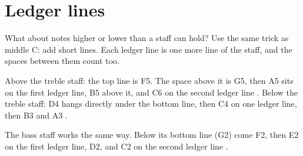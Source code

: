 \section{Ledger lines}

What about notes higher or lower than a staff can hold? Use the same trick as middle C: add short lines. Each ledger line is one more line of the staff, and the spaces between them count too.

Above the treble staff: the top line is F5. The space above it is G5, then A5 sits on the first ledger line, B5 above it, and C6 on the second ledger line . Below the treble staff: D4 hangs directly under the bottom line, then C4 on one ledger line, then B3 and A3 .

The bass staff works the same way. Below its bottom line (G2) come F2, then E2 on the first ledger line, D2, and C2 on the second ledger line .

